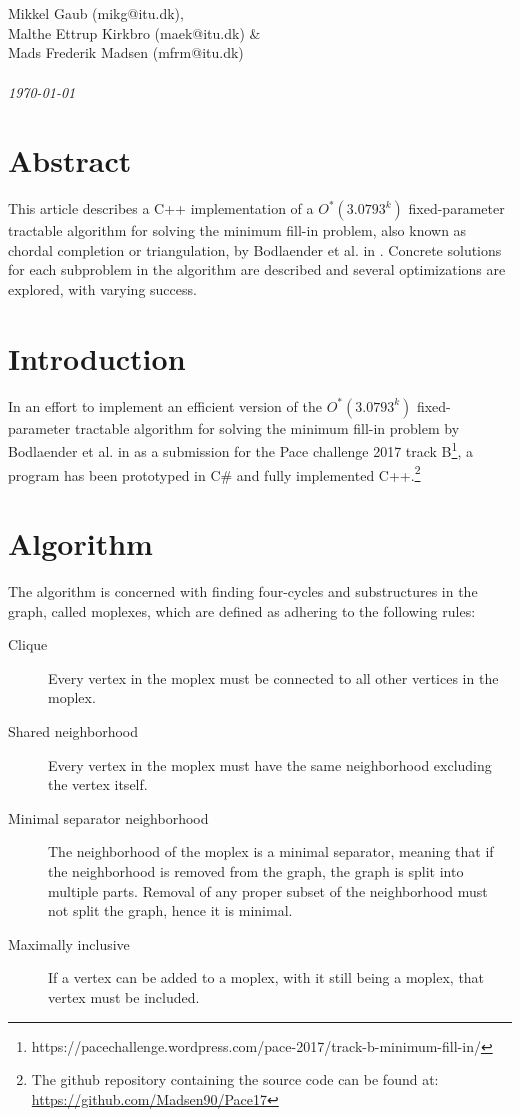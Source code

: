\documentclass{article}
\begin{document}
\begin{titlepage}
		 \\ \\
		Mikkel Gaub (mikg@itu.dk), \\ Malthe Ettrup Kirkbro (maek@itu.dk)  \& \\ Mads Frederik Madsen (mfrm@itu.dk)	\\ \\
		\hspace{-18pt}
		\textit{\today}
		\thispagestyle{empty}
		\vspace{\fill}
		\section*{Abstract}
		This article describes a C++ implementation of a $O^*(3.0793^k)$ fixed-parameter tractable algorithm for solving the minimum fill-in problem, also known as chordal completion or triangulation, by Bodlaender et al. in \cite{algorithm}.
		Concrete solutions for each subproblem in the algorithm are described and several optimizations are explored, with varying success.
	\end{titlepage}
	\clearpage

	\section{Introduction}
	In an effort to implement an efficient version of the $O^*(3.0793^k)$ fixed-parameter tractable algorithm for solving the minimum fill-in problem by Bodlaender et al. in \cite[section 4]{algorithm} as a submission for the Pace challenge 2017 track B\footnote{https://pacechallenge.wordpress.com/pace-2017/track-b-minimum-fill-in/}, a program has been prototyped in C\# and fully implemented C++.\footnote{The github repository containing the source code can be found at: \url{https://github.com/Madsen90/Pace17}}

	\section{Algorithm}
	The algorithm is concerned with finding four-cycles and substructures in the graph, called moplexes, which are defined as adhering to the following rules: \\

	\begin{description}
		\item[Clique] Every vertex in the moplex must be connected to all other vertices in the moplex.
		\item[Shared neighborhood] Every vertex in the moplex must have the same neighborhood excluding the vertex itself.
		\item[Minimal separator neighborhood] The neighborhood of the moplex is a minimal separator, meaning that if the neighborhood is removed from the graph, the graph is split into multiple parts. Removal of any proper subset of the neighborhood must not split the graph, hence it is minimal.
		\item[Maximally inclusive] If a vertex can be added to a moplex, with it still being a moplex, that vertex must be included.
	\end{description}
\end{document}
